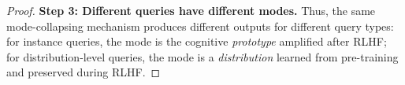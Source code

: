\begin{proof}
\textbf{Step 3: Different queries have different modes.}
Thus, the same mode-collapsing mechanism produces different outputs for different query types: for instance queries, the mode is the cognitive \textit{prototype} amplified after RLHF; for distribution-level queries, the mode is a \textit{distribution} learned from pre-training and preserved during RLHF. %


\end{proof}



